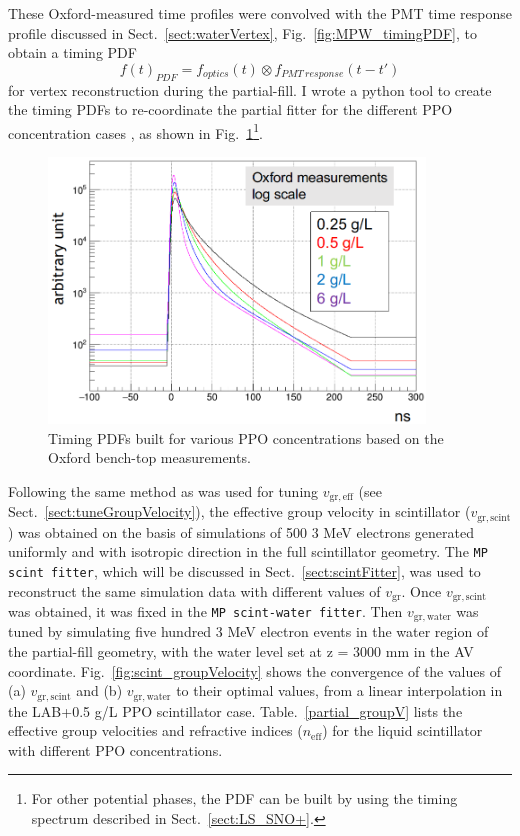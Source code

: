 These Oxford-measured time profiles were convolved with the PMT time response profile discussed in Sect.~\ref{sect:waterVertex}, Fig.~\ref{fig:MPW_timingPDF}, to obtain a timing PDF 
\begin{equation}\label{eq:OxfordTimingPDF}
f(t)_{PDF} = f_{optics}(t)\otimes f_{PMT~response}(t-t')
\end{equation}
for vertex reconstruction during the partial-fill. I wrote a python tool to create the timing PDFs to re-coordinate the partial fitter for the different PPO concentration cases \cite{partialFitterPDF}, as shown in Fig.~\ref{fig:oxfordPdf}\footnote{For other potential phases, the PDF can be built by using the timing spectrum described in Sect.~\ref{sect:LS_SNO+}.}.
\begin{figure}[!htb]
	\centering
	\includegraphics[width=10cm]{oxfordPdf_log.png}
	\caption{Timing PDFs built for various PPO concentrations based on the Oxford bench-top measurements.}
	\label{fig:oxfordPdf}
\end{figure}

Following the same method as was used for tuning $v_\mathrm{gr,eff}$ (see Sect.~\ref{sect:tuneGroupVelocity}), the effective group velocity in scintillator ($v_\mathrm{gr,scint}$) was obtained on the basis of simulations of 500 3 MeV electrons generated uniformly and with isotropic direction in the full scintillator geometry. The \texttt{MP scint fitter}, which will be discussed in Sect.~\ref{sect:scintFitter}, was used to reconstruct the same simulation data with different values of $v_\mathrm{gr}$. Once $v_\mathrm{gr,scint}$ was obtained, it was fixed in the \texttt{MP scint-water fitter}. Then $v_\mathrm{gr,water}$ was tuned by simulating five hundred 3 MeV electron events in the water region of the partial-fill geometry, with the water level set at z = 3000 mm in the AV coordinate. Fig.~\ref{fig:scint_groupVelocity} shows the convergence of the values of (a) $v_\mathrm{gr,scint}$ and (b) $v_\mathrm{gr,water}$ to their optimal values, from a linear interpolation in the LAB+0.5 g/L PPO scintillator case. Table.~\ref{partial_groupV} lists the effective group velocities and refractive indices ($n_\mathrm{eff}$) for the liquid scintillator with different PPO concentrations. 
		
